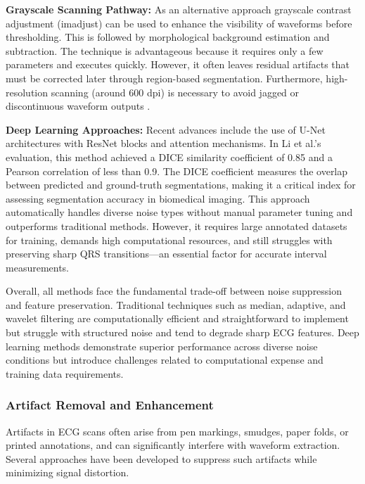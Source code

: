 \textbf{Grayscale Scanning Pathway:} As an alternative approach grayscale contrast adjustment (imadjust) can be used to enhance the visibility of waveforms before thresholding. This is followed by morphological background estimation and subtraction. The technique is advantageous because it requires only a few parameters and executes quickly. However, it often leaves residual artifacts that must be corrected later through region-based segmentation. Furthermore, high-resolution scanning (around 600 dpi) is necessary to avoid jagged or discontinuous waveform outputs \cite{Tun2017AnalysisOC}.

\textbf{Deep Learning Approaches:} Recent advances include the use of U-Net architectures with ResNet blocks and attention mechanisms. In Li et al.’s evaluation, this method achieved a DICE similarity coefficient of 0.85 and a Pearson correlation of less than 0.9. The DICE coefficient measures the overlap between predicted and ground-truth segmentations, making it a critical index for assessing segmentation accuracy in biomedical imaging. This approach automatically handles diverse noise types without manual parameter tuning and outperforms traditional methods. However, it requires large annotated datasets for training, demands high computational resources, and still struggles with preserving sharp QRS transitions—an essential factor for accurate interval measurements.

Overall, all methods face the fundamental trade-off between noise suppression and feature preservation. Traditional techniques such as median, adaptive, and wavelet filtering are computationally efficient and straightforward to implement but struggle with structured noise and tend to degrade sharp ECG features. Deep learning methods demonstrate superior performance across diverse noise conditions but introduce challenges related to computational expense and training data requirements.


\subsubsection{Artifact Removal and Enhancement}

Artifacts in ECG scans often arise from pen markings, smudges, paper folds, or printed annotations, and can significantly interfere with waveform extraction. Several approaches have been developed to suppress such artifacts while minimizing signal distortion.

